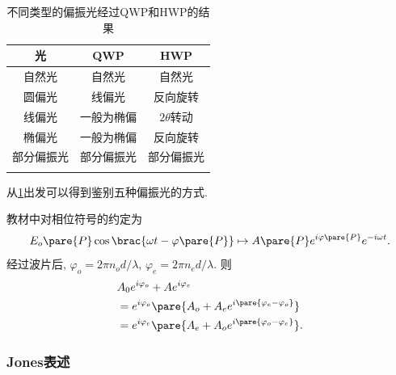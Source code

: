 \documentclass{ctexart}
\begin{document}
\begin{longtable}{|c|c|c|}
    \hline
    光 & QWP& HWP \\
    \hline
    自然光 & 自然光 & 自然光 \\
    \hline
    圆偏光 & 线偏光 & 反向旋转 \\
    \hline
    线偏光 & 一般为椭偏 & $2\theta$转动 \\
    \hline
    椭偏光 & 一般为椭偏 & 反向旋转 \\
    \hline
    部分偏振光 & 部分偏振光 & 部分偏振光 \\
    \hline
    \caption{不同类型的偏振光经过QWP和HWP的结果}
    \label{fig:不同类型的偏振光经过QWP和HWP的结果}
\end{longtable}
从\cref{fig:不同类型的偏振光经过QWP和HWP的结果}出发可以得到鉴别五种偏振光的方式.
\begin{remark}
    教材中对相位符号的约定为
    \[ E_o\pare{P} \cos \brac{\omega t - \varphi\pare{P}} \mapsto A\pare{P} e^{i\varphi\pare{P}}e^{-i\omega t}. \]
    经过波片后, $\varphi_o = 2\pi n_od/\lambda$, $\varphi_e = 2\pi n_e d/\lambda$. 则
    \begin{align*}
        & A_0 e^{i\varphi_o} + Ae^{i\varphi_e} \\
        &= e^{i\varphi_o} \pare{A_o + A_e e^{i\pare{\varphi_e - \varphi_o}}} \\
        &= e^{i\varphi_e} \pare{A_e + A_o e^{i\pare{\varphi_o - \varphi_e}}}.
    \end{align*}
\end{remark}


\subsubsection{Jones表述} %
\label{ssub:jones表述}
\end{document}
